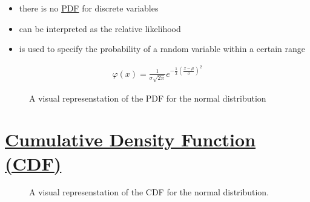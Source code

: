 \documentclass[
  a4paper,
]{scrbook}
\providecommand{\tightlist}{%
  \setlength{\itemsep}{0pt}\setlength{\parskip}{0pt}}\usepackage{longtable,booktabs,array}
\begin{document}
\begin{itemize}
\tightlist
\item
  there is no \hyperref[acronyms_PDF]{PDF} for discrete variables
\item
  can be interpreted as the relative likelihood
\item
  is used to specify the probability of a random variable within a
  certain range
\end{itemize}

\begin{align}
\varphi(x) = \frac{1}{\sigma\sqrt{2\pi}}e^{-\frac{1}{2}(\frac{x-\mu}{\sigma})^2}
\end{align}

\begin{figure}[ht]


\caption{\label{fig-pdf-000}A visual represenstation of the PDF for the
normal distribution}

\end{figure}%

\section{\texorpdfstring{\hyperref[acronyms_CDF]{Cumulative Density
Function (CDF)}}{Cumulative Density Function (CDF)}}\label{section-4}

\begin{figure}[ht]


\caption{\label{fig-cdf-000-scr}A visual represenstation of the CDF for
the normal distribution.}

\end{figure}%
\end{document}
